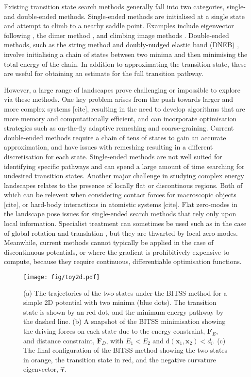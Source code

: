 \documentclass[aps,prl,twocolumn,groupedaddress]{revtex4}
\newcommand{\temp}[1]{{\leavevmode\color{red}#1}}
\begin{document}
\topic Existing transition state search methods generally fall into two categories, single- and double-ended methods.
Single-ended methods are initialised at a single state and attempt to climb to a nearby saddle point.
Examples include eigenvector following \cite{Cerjan1981}, the dimer method \cite{Heyden2005,Kastner2008}, and climbing image methods \cite{E2007,Ren2013}.
Double-ended methods, such as the string method \cite{E2002,E2007} and doubly-nudged elastic band (DNEB) \cite{Trygubenko2004}, involve initialising a chain of states between two minima and then minimising the total energy of the chain.
In addition to approximating the transition state, these are useful for obtaining an estimate for the full transition pathway.

\topic However, a large range of landscapes prove challenging or impossible to explore via these methods.
One key problem arises from the push towards larger and more complex systems \temp{[cite]}, resulting in the need to develop algorithms that are more memory and computationally efficient, and can incorporate optimisation strategies such as on-the-fly adaptive remeshing and coarse-graining.
Current double-ended methods require a chain of tens of states to gain an accurate approximation, and have issues with remeshing resulting in a different discretisation for each state.
Single-ended methods are not well suited for identifying specific pathways and can spend a large amount of time searching for undesired transition states.
Another major challenge in studying complex energy landscapes relates to the presence of locally flat or discontinous regions.
Both of which can be relevent when considering contact forces for macroscopic objects \temp{[cite]}, or hard-body interactions in atomistic systems \temp{[cite]}.
Flat zero-modes in the landscape pose issues for single-ended search methods that rely only upon local information.
Specialist treatment can sometimes be used such as in the case of global rotation and translation \temp{\cite{Wales2004}}, but they are thwarted by local zero-modes.
Meanwhile, current methods cannot typically be applied in the case of discontinuous potentials, or where the gradient is prohibitively expensive to compute, because they require continuous, differentiable optimisation functions.

\begin{figure}[htb]
  \texttt{[image: fig/toy2d.pdf]}
  \caption{\label{fig:toy2d}
    (a) The trajectories of the two states under the BITSS method for a simple 2D potential with two minima (blue dots).
        The transition state is shown by an red dot, and the minimum energy pathway by the dashed line.
    (b) A snapshot of the BITSS minimisation showing the driving forces on each state due to the energy constraint, $\bm{F}_E$, and distance constraint, $\bm{F}_D$, with $E_1 < E_2$ and $\mathrm{d}(\bm{x}_1,\bm{x}_2) < d_i$.
    (c) The final configuration of the BITSS method showing the two states in orange, the transition state in red, and the negative curvature eigenvector, $\bm{\hat{\tau}}$.
  }
\end{figure}
\end{document}
